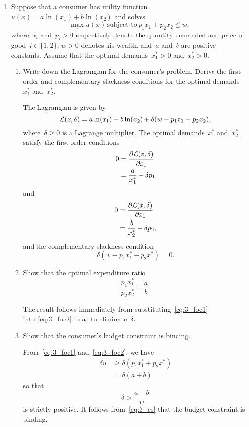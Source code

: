
\begin{enumerate}

	\item
	Suppose that a consumer has utility function~$u(x)=a\ln(x_1)+b\ln(x_2)$ and solves
	\[ \max_xu(x)\ \text{subject to}\ p_1x_1+p_2x_2\le w, \label{eq:3_prob} \]
	where~$x_i$ and~$p_i>0$ respectively denote the quantity demanded and price of good~$i\in\{1,2\}$, $w>0$ denotes his wealth, and~$a$ and~$b$ are positive constants.
	Assume that the optimal demands~$x_1^*>0$ and~$x_2^*>0$.
	\begin{enumerate}

		\item
		Write down the Lagrangian for the consumer's problem.
		Derive the first-order and complementary slackness conditions for the optimal demands~$x_1^*$ and~$x_2^*$.
		\begin{solution}
			The Lagrangian is given by
			\[ \mathcal{L}(x,\delta)=a\ln(x_1)+b\ln(x_2)+\delta(w-p_1x_1-p_2x_2), \]
			where~$\delta\ge0$ is a Lagrange multiplier.
			The optimal demands~$x_1^*$ and~$x_2^*$ satisfy the first-order conditions
			\begin{align}
				0
				&= \frac{\partial\mathcal{L}(x,\delta)}{\partial x_1}\\
				&= \frac{a}{x_1^*}-\delta p_1 \label{eq:3_foc1}
			\end{align}
			and
			\begin{align}
				0
				&= \frac{\partial\mathcal{L}(x,\delta)}{\partial x_1}\\
				&= \frac{b}{x_2^*}-\delta p_2, \label{eq:3_foc2}
			\end{align}
			and the complementary slackness condition
			\[ \delta(w-p_1x_1^*-p_2x^*)=0. \label{eq:3_cs} \]
		\end{solution}

		\item
		Show that the optimal expenditure ratio
		\[ \frac{p_1x_1^*}{p_2x_2^*}=\frac{a}{b}. \label{eq:3b_ans} \]
		\begin{solution}
			The result follows immediately from substituting~\eqref{eq:3_foc1} into~\eqref{eq:3_foc2} so as to eliminate~$\delta$.
		\end{solution}

		\item
		Show that the consumer's budget constraint is binding.
		\begin{solution}
			From~\eqref{eq:3_foc1} and~\eqref{eq:3_foc2}, we have
			\begin{align}
				\delta w
				&\ge \delta(p_1x_1^*+p_2x^*)\\
				&= \delta(a+b)
			\end{align}
			so that
			\[ \delta>\frac{a+b}{w} \]
			is strictly positive.
			It follows from~\eqref{eq:3_cs} that the budget constraint is binding.
		\end{solution}


\end{enumerate}
\end{enumerate}

